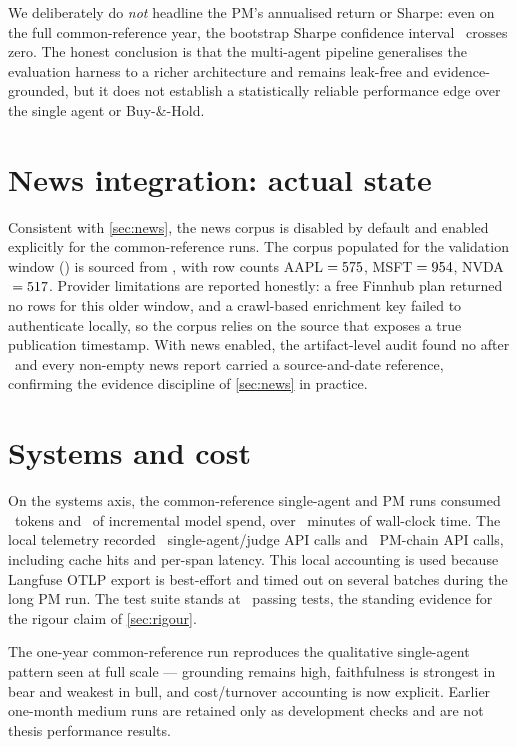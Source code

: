 We deliberately do \emph{not} headline the PM's annualised return or Sharpe: even on the full
common-reference year, the bootstrap Sharpe confidence interval \commonPmSharpeCI\ crosses
zero. The honest conclusion is that the multi-agent pipeline generalises the evaluation harness
to a richer architecture and remains leak-free and evidence-grounded, but it does not establish
a statistically reliable performance edge over the single agent or Buy-\&-Hold.

\section{News integration: actual state}
\label{sec:resultsnews}

Consistent with \cref{sec:news}, the news corpus is disabled by default and enabled explicitly
for the common-reference runs. The corpus populated for the validation window
(\newsCorpusWindow) is sourced from \newsCorpusSource, with row counts
AAPL${}=575$, MSFT${}=954$, NVDA${}=517$. Provider limitations
are reported honestly: a free Finnhub plan returned no rows for this older window, and a
crawl-based enrichment key failed to authenticate locally, so the corpus relies on the source
that exposes a true publication timestamp. With news enabled, the artifact-level audit found no
 after \tnow\ and every non-empty news report carried a source-and-date
reference, confirming the evidence discipline of \cref{sec:news} in practice.

\section{Systems and cost}
\label{sec:resultssystems}

On the systems axis, the common-reference single-agent and PM runs consumed
\commonTotalTokens\ tokens and \commonTotalCost\ of incremental model spend, over
\commonWallClockMinutes\ minutes of wall-clock time. The local telemetry recorded
\commonSingleApiCalls\ single-agent/judge API calls and \commonPmApiCalls\ PM-chain API calls,
including cache hits and per-span latency. This local accounting is used because Langfuse OTLP
export is best-effort and timed out on several batches during the long PM run. The test suite
stands at \nTests\ passing tests, the standing evidence for the rigour claim of
\cref{sec:rigour}.

\begin{prelim}
The one-year common-reference run reproduces the qualitative single-agent pattern seen at full
scale --- grounding remains high, faithfulness is strongest in bear and weakest in bull, and
cost/turnover accounting is now explicit. Earlier one-month medium runs are retained only as
development checks and are not thesis performance results.
\end{prelim}
